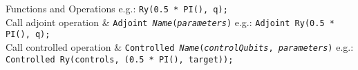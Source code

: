 \documentclass[10pt,english,landscape]{article}
\begin{document}
\begin{multicols}{3}
\begin{keysref}{Functions and Operations}
                     e.g.: \texttt{Ry(0.5 * PI(), q);} \\
    Call adjoint \newline operation & \texttt{Adjoint \emph{Name}(\emph{parameters})} \newline
                     e.g.: \texttt{Adjoint Ry(0.5 * PI(), q);} \\
    Call controlled \newline operation & \texttt{Controlled \emph{Name}(\emph{controlQubits}, \newline \hphantom{....}\emph{parameters})} \newline
                     e.g.: \texttt{Controlled Ry(controls, \newline \hphantom{....}(0.5 * PI(), target));} \\
  \end{keysref}


\end{multicols}
\end{document}
